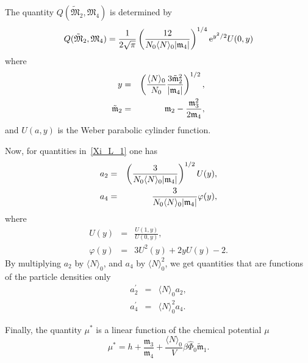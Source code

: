 The quantity $Q(\tilde{\mathfrak{M}}_2, \mathfrak{M}_4)$ is determined by
\begin{equation*}
	\label{quantity_Q}
	Q(\tilde{\mathfrak{M}}_2, \mathfrak{M}_4) = \frac{1}{2\sqrt{\pi}} \left(\frac{12}{N_0 \langle N \rangle_0\abs{\mathfrak{m}_4}}\right)^{1/4} {\rm e}^{y^2/2} U(0,y)
\end{equation*}
where
\begin{eqnarray*}
	y & = & \left(\frac{\langle N \rangle_0}{N_0} \frac{3\tilde{\mathfrak{m}}_2^2}{\abs{\mathfrak{m}_4}}\right)^{1/2},
	\\
	\tilde{\mathfrak{m}}_2 & = & \mathfrak{m}_2 - \frac{\mathfrak{m}_3^2}{2\mathfrak{m}_4},
\end{eqnarray*}
and $U(a, y)$ is the Weber parabolic cylinder function.

Now, for quantities in~\eqref{Xi_L_1} one has
\begin{eqnarray*}
	a_2 & = & \left(\frac{3}{N_0 \langle N \rangle_0 \abs{\mathfrak{m}_4}}\right)^{1/2} U(y),
	\\
	a_4 & = & \frac{3}{N_0 \langle N \rangle_0 \abs{\mathfrak{m}_4}} \varphi(y),
\end{eqnarray*}
where
\begin{eqnarray*}
	U(y) & = & \frac{U(1,y)}{U(0,y)},
	\\
	\varphi(y) & = & 3U^2(y) + 2yU(y) -2.
\end{eqnarray*}
By multiplying $a_2$ by $\langle N \rangle_0$, and $a_4$ by $\langle N \rangle_0^2$, we get quantities that are functions of the particle densities only
\begin{eqnarray*}
	a_2^{'} & = & \langle N \rangle_0 a_2,
	\\
	a_4^{'} & = & \langle N \rangle_0^2 a_4.
\end{eqnarray*}

Finally, the quantity $\mu^*$ is a linear function of the chemical potential $\mu$
\begin{equation*}
	\mu^* = h + \frac{\mathfrak{m}_3}{\mathfrak{m}_4} + \frac{\langle N \rangle_0}{V} \beta\hat{\Phi}_0 \tilde{\mathfrak{m}}_1.
\end{equation*}